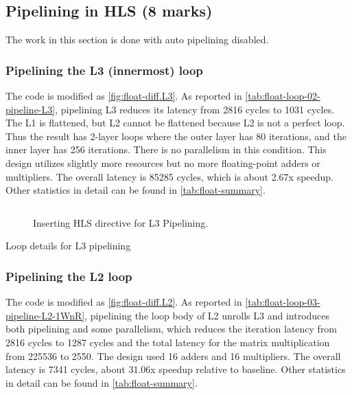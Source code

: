 \subsection{Pipelining in HLS (8 marks)}

The work in this section is done with auto pipelining disabled.

\subsubsection{Pipelining the L3 (innermost) loop}\label{sec:1bL3}

The code is modified as \autoref{fig:float-diff.L3}.
As reported in \autoref{tab:float-loop-02-pipeline-L3}, pipelining L3 reduces its latency from 2816 cycles to 1031 cycles.
The L1 is flattened, but L2 cannot be flattened because L2 is not a perfect loop.
Thus the result has 2-layer loops where the outer layer has 80 iterations, and the inner layer has 256 iterations.
There is no parallelism in this condition.
This design utilizes slightly more resources but no more floating-point adders or multipliers.
The overall latency is 85285 cycles, which is about 2.67x speedup.
Other statistics in detail can be found in \autoref{tab:float-summary}.

\begin{figure}[ht!]
    \centering
    \inputminted{diff}{program/diff.L3}
    \caption{Inserting HLS directive for L3 Pipelining.}\label{fig:float-diff.L3}
\end{figure}

\begin{table}[ht!]
    \caption{Loop details for L3 pipelining}
    \label{tab:float-loop-02-pipeline-L3}
    \centering
    
\end{table}

\subsubsection{Pipelining the L2 loop}\label{sec:1bL2}

The code is modified as \autoref{fig:float-diff.L2}.
As reported in \autoref{tab:float-loop-03-pipeline-L2-1WnR}, pipelining the loop body of L2 unrolls L3 and introduces both pipelining and some parallelism, which reduces the iteration latency from 2816 cycles to 1287 cycles and the total latency for the matrix multiplication from 225536 to 2550.
The design used 16 adders and 16 multipliers.
The overall latency is 7341 cycles, about 31.06x speedup relative to baseline.
Other statistics in detail can be found in \autoref{tab:float-summary}.

